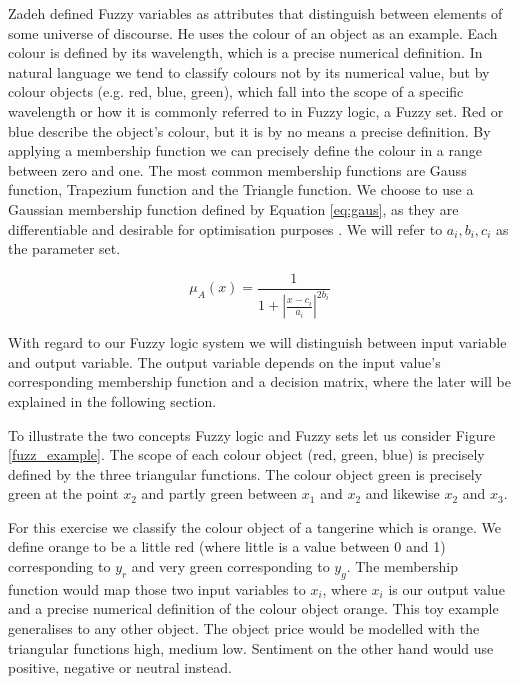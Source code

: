 Zadeh \cite{Zadeh65}  defined Fuzzy variables as attributes that distinguish between elements of some universe of discourse. He uses the colour of an object as an example. Each colour is defined by its wavelength, which is a precise numerical definition. In natural language we tend to classify colours not by its numerical value, but by colour objects (e.g. red, blue, green), which fall into the scope of a specific wavelength or how it is commonly referred to in Fuzzy logic,  a Fuzzy set. Red or blue describe the object's colour, but it is by no means a precise definition. By applying a membership function we can precisely define the colour in a range between zero and one. The most common membership functions are Gauss function, Trapezium function and the Triangle function. We choose to use a Gaussian membership function defined by Equation \ref{eq:gaus},  as they are differentiable and desirable for optimisation purposes \cite{wu12}. We will refer to $a_i, b_i, c_i$ as the parameter set.  

\begin{equation} \label{eq:gaus}
\mu_A(x) =  \frac{1}{ 1 + |\frac{x- c_i }{a_i}|^{2b_i}  }\end{equation}


With regard to our Fuzzy logic system we will distinguish between input variable and output variable. The output variable depends on the input value's corresponding membership function and a decision matrix, where the later will be explained in the following section. 

 To illustrate the two concepts Fuzzy logic and Fuzzy sets let us consider Figure \ref{fuzz_example}. The scope of each colour object (red, green, blue) is precisely defined by the three triangular functions. The colour object green is precisely green at the point $x_2$ and partly green between $x_1$ and $x_2$ and likewise $x_2$ and $x_3$. 
 
For this exercise we classify the colour object of a tangerine which is orange.  We define orange to be a little red (where little is a value between 0 and 1) corresponding to $y_r$ and very green corresponding to $y_g$.  The membership function would map those two input variables to $x_i$, where $x_i$ is our output value and a precise numerical definition of the colour object orange. This toy example generalises to any other object. The object price would be modelled with the triangular functions high, medium low. Sentiment on the other hand would use positive, negative or neutral instead. 






